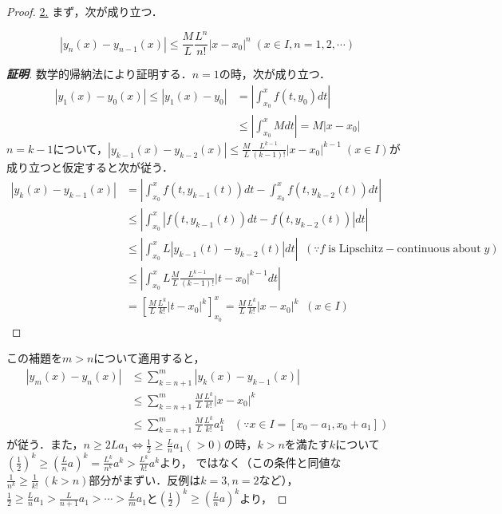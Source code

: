 \documentclass[uplatex,dvipdfmx]{jsreport}
\begin{document}
\begin{proof}
    \underline{2.} まず，次が成り立つ．
    \begin{lemma*}
        \[|y_n(x)-y_{n-1}(x)|\le\frac{M}{L}\frac{L^n}{n!}|x-x_0|^n\;(x\in I,n=1,2,\cdots)\]
    \end{lemma*}
    \begin{proof}[\bf{証明}]
        数学的帰納法により証明する．$n=1$の時，次が成り立つ．
        \begin{align*}
            |y_1(x)-y_0(x)| \le |y_1(x)-y_0|
            &= \left|\int^x_{x_0}f(t,y_0)dt\right|\\
            &\le \left|\int^x_{x_0}Mdt\right| = M|x-x_0|
        \end{align*}
        $n=k-1$について，$|y_{k-1}(x)-y_{k-2}(x)|\le \frac{M}{L}\frac{L^{k-1}}{(k-1)!}|x-x_0|^{k-1}\;(x\in I)$が成り立つと仮定すると次が従う．
        \begin{align*}
            |y_k(x)-y_{k-1}(x)| &=\left| \int^x_{x_0}f(t,y_{k-1}(t))dt - \int^x_{x_0}f(t,y_{k-2}(t))dt \right|\\
            &\le  \left| \int^x_{x_0}|f(t,y_{k-1}(t))dt - f(t,y_{k-2}(t))|dt \right|\\
            &\le \left| \int^x_{x_0}L|y_{k-1}(t)-y_{k-2}(t)| dt \right|\;\;(\because f\mathrm{\;is\;Lipschitz-continuous\;about\;}y)\\
            &\le \left| \int^x_{x_0}L\frac{M}{L}\frac{L^{k-1}}{(k-1)!}|t-x_0|^{k-1} dt \right|\\
            &= \left[ \frac{M}{L}\frac{L^k}{k!}|t-x_0|^{k} \right]^x_{x_0} = \frac{M}{L}\frac{L^k}{k!}|x-x_0|^{k}\;\;(x\in I)
        \end{align*}
    \end{proof}
    この補題を$m>n$について適用すると，
    \begin{align*}
        |y_m(x)-y_n(x)| &\le \sum^m_{k=n+1}|y_k(x)-y_{k-1}(x)|\\
        &\le \sum^m_{k=n+1}\frac{M}{L}\frac{L^k}{k!}|x-x_0|^k\\
        &\le \sum^m_{k=n+1}\frac{M}{L}\frac{L^k}{k!}a_1^k\;\;\;(\because x\in I=[x_0-a_1,x_0+a_1])
    \end{align*}
    が従う．また，$n\ge 2La_1\Leftrightarrow \frac{1}{2}\ge\frac{L}{n}a_1(>0)$の時，$k>n$を満たす$k$について$\left(\frac{1}{2}\right)^k\ge\left(\frac{L}{n}a\right)^k=\frac{L^k}{n^k}a^k>\frac{L^k}{k!}a^k$より，
    ではなく（この条件と同値な$\frac{1}{n^k}\ge\frac{1}{k!}\;(k>n)$部分がまずい．反例は$k=3,n=2$など），
    $\frac{1}{2}\ge\frac{L}{n}a_1>\frac{L}{n+1}a_1>\cdots>\frac{L}{m}a_1$と$\left(\frac{1}{2}\right)^k\ge\left(\frac{L}{n}a\right)^k$より，

\end{proof}
\end{document}
